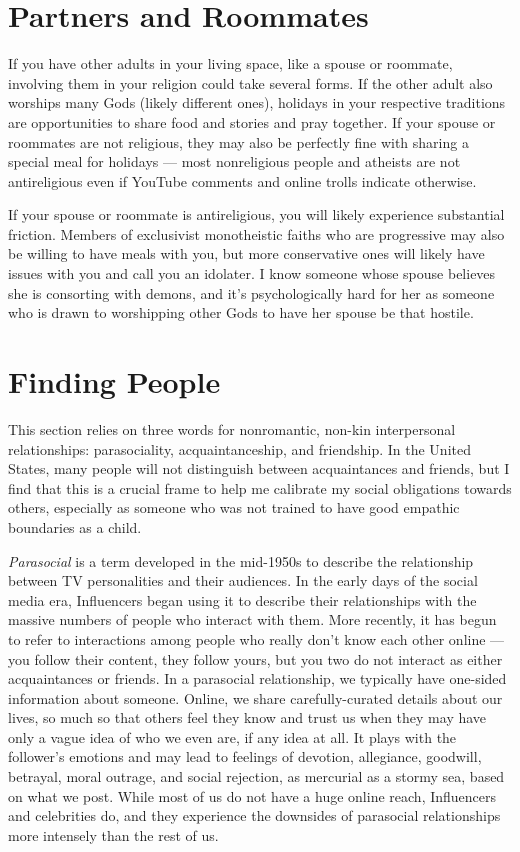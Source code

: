 \documentclass[
]{book}
\begin{document}
\hypertarget{partners-and-roommates}{%
\section{Partners and Roommates}\label{partners-and-roommates}}

If you have other adults in your living space, like a spouse or roommate, involving them in your religion could take several forms. If the other adult also worships many Gods (likely different ones), holidays in your respective traditions are opportunities to share food and stories and pray together. If your spouse or roommates are not religious, they may also be perfectly fine with sharing a special meal for holidays --- most nonreligious people and atheists are not antireligious even if YouTube comments and online trolls indicate otherwise.

If your spouse or roommate is antireligious, you will likely experience substantial friction. Members of exclusivist monotheistic faiths who are progressive may also be willing to have meals with you, but more conservative ones will likely have issues with you and call you an idolater. I know someone whose spouse believes she is consorting with demons, and it's psychologically hard for her as someone who is drawn to worshipping other Gods to have her spouse be that hostile.

\hypertarget{finding-people}{%
\section{Finding People}\label{finding-people}}

This section relies on three words for nonromantic, non-kin interpersonal relationships: parasociality, acquaintanceship, and friendship. In the United States, many people will not distinguish between acquaintances and friends, but I find that this is a crucial frame to help me calibrate my social obligations towards others, especially as someone who was not trained to have good empathic boundaries as a child.

\emph{Parasocial} is a term developed in the mid-1950s to describe the relationship between TV personalities and their audiences. In the early days of the social media era, Influencers began using it to describe their relationships with the massive numbers of people who interact with them. More recently, it has begun to refer to interactions among people who really don't know each other online --- you follow their content, they follow yours, but you two do not interact as either acquaintances or friends. In a parasocial relationship, we typically have one-sided information about someone. Online, we share carefully-curated details about our lives, so much so that others feel they know and trust us when they may have only a vague idea of who we even are, if any idea at all. It plays with the follower's emotions and may lead to feelings of devotion, allegiance, goodwill, betrayal, moral outrage, and social rejection, as mercurial as a stormy sea, based on what we post. While most of us do not have a huge online reach, Influencers and celebrities do, and they experience the downsides of parasocial relationships more intensely than the rest of us.
\end{document}
